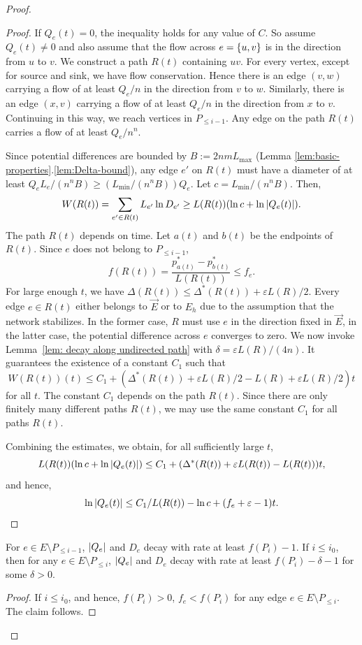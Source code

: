 \documentclass[11pt,a4paper]{article}
\newcommand{\Lmax}{\ensuremath{L_{\mathrm{max}}}}
\newcommand{\Eorient}{\overrightarrow{E}} \newcommand{\CB}{\mathit{F}}
\begin{document}
\begin{proof}
\begin{proof}
If $Q_e(t) = 0$, the inequality holds for any value of $C$. So assume $Q_e(t)
\not= 0$ and also assume that the flow across $e = \{ u,v \}$ is in the direction from $u$ to
$v$. We construct a path $R(t)$ containing $uv$. 
For every vertex, except for source and
sink, we have flow conservation. Hence there is an edge $(v,w)$ carrying a flow
of at least $Q_e/n$ in the direction from $v$ to $w$. Similarly, there is an
edge $(x,v)$ carrying a flow of at least $Q_e/n$ in the direction from $x$ to
$v$. Continuing in this way, we reach vertices in $P_{\le i-1}$. Any
edge on the path $R(t)$ carries a flow of at least $Q_e/n^n$. 

Since potential differences are
bounded by $B:=2nm\Lmax$ (Lemma
\ref{lem:basic-properties}.\ref{lem:Delta-bound}), any edge $e'$ on $R(t)$ must
have a diameter of at least $Q_e
L_e/(n^n B) \ge (L_{\min}/(n^n B))Q_e$. Let $c = L_{\min}/(n^n B)$. Then, 
\[  W(R(t)) = \sum_{e' \in R(t)} L_{e'} \ln D_{e'} \ge L(R(t)) (\ln c + \ln
| Q_e(t) |).\]
The path $R(t)$ depends on time. Let $a(t)$ and $b(t)$ be the endpoints of $R(t)$. 
Since $e$ does not belong to $P_{\le i-1}$,
\[   f(R(t)) = \frac{p^*_{a(t)} - p^*_{b(t)}}{L(R(t))} \le f_e. \]
For large enough $t$, we have $\Delta(R(t)) \le \Delta^*(R(t)) + \varepsilon
L(R)/2$. Every edge $e \in R(t)$ either belongs to $\Eorient$ or to $E_h$ 
due to the assumption that the network stabilizes. In the
former case, $R$ must use $e$ in the direction fixed in $\Eorient$, in the
latter case, the potential difference across $e$ converges to zero. We now invoke
Lemma~\ref{lem: decay along undirected path} with $\delta = \varepsilon
L(R)/(4n)$. It guarantees the existence of a constant $C_1$ such that 
\[   W(R(t))(t) \le C_1 + (\Delta^*(R(t)) + \varepsilon L(R)/2 - L(R) + \varepsilon L(R)/2) t  \]
for all $t$. The constant $C_1$ depends on the path $R(t)$. Since there are only
finitely many different paths $R(t)$, we may use the same constant $C_1$ for all
paths $R(t)$. 

Combining the estimates, we obtain, for all sufficiently large $t$, 
\[ L(R(t)) (\ln c + \ln
| Q_e(t) |)  \le  C_1 + (\Delta^*(R(t)) + \varepsilon L(R(t)) - L(R(t)) ) t,
\]
and hence,
\[ \ln | Q_e(t) | \le C_1/L(R(t)) - \ln c  + (f_e + \varepsilon - 1) t.\]

\end{proof}

\begin{corollary}\label{cor:strict-rate}
 For $e \in E \setminus P_{\le i-1}$, $| Q_e |$ and $D_e$
decay with rate at least $f(P_i) - 1$. 
If $i \le i_0$, then for any $e \in E \setminus P_{\le i}$, $| Q_e |$ and $D_e$
decay with rate at least $f(P_i) - \delta - 1$ for some $\delta > 0$.
\end{corollary}
\begin{proof} If $i \le i_0$, and hence, $f(P_i) > 0$, $f_e < f(P_i)$ for any
edge $e \in E \setminus P_{\le i}$. The claim follows. \end{proof}




\end{proof}
\end{document}
